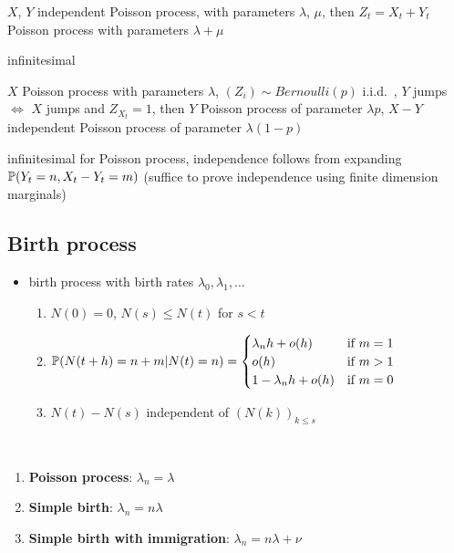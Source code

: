 \begin{thm}[Superposition]
    $X$, $Y$ independent Poisson process, with parameters $\lambda$, $\mu$, then $Z_t = X_t + Y_t$ Poisson process with parameters $\lambda + \mu$
\end{thm}
\begin{pf}
    infinitesimal
\end{pf}

\begin{thm}[Thining]
    $X$ Poisson process with parameters $\lambda$, $(Z_i) \sim Bernoulli(p)$ i.i.d.\ , $Y$ jumps $\iff$ $X$ jumps and $Z_{X_t} = 1$, then
    $Y$ Poisson process of parameter $\lambda p$, $X - Y$ independent Poisson process of parameter $\lambda (1 - p)$
\end{thm}
\begin{pf}
    infinitesimal for Poisson process, independence follows from expanding $\mathbb{P}(Y_t = n, X_t - Y_t = m)$ (suffice to prove independence using finite dimension marginals)
\end{pf}

\subsection{Birth process}\label{subsec:birth-process}

\begin{itemize}
    \item birth process with birth rates $\lambda_0, \lambda_1, \dots$
    \begin{enumerate}
        \item $N(0) = 0$, $N(s) \leq N(t)$ for $s < t$
        \item $\mathbb{P}(N(t + h) = n + m| N(t) = n) = \begin{cases}
                                                     \lambda_n h + o(h) & \text{if } m = 1\\
                                                     o(h) & \text{if } m > 1\\
                                                     1 - \lambda_n h + o(h) & \text{if } m = 0\\
        \end{cases}$
        \item $N(t) - N(s)$ independent of $(N(k))_{k \leq s}$
    \end{enumerate}
\end{itemize}

\begin{example}\,
    \begin{enumerate}
        \item \textbf{Poisson process}: $\lambda_n = \lambda$
        \item \textbf{Simple birth}: $\lambda_n = n\lambda$
        \item \textbf{Simple birth with immigration}: $\lambda_n = n\lambda + \nu$
    \end{enumerate}
\end{example}

